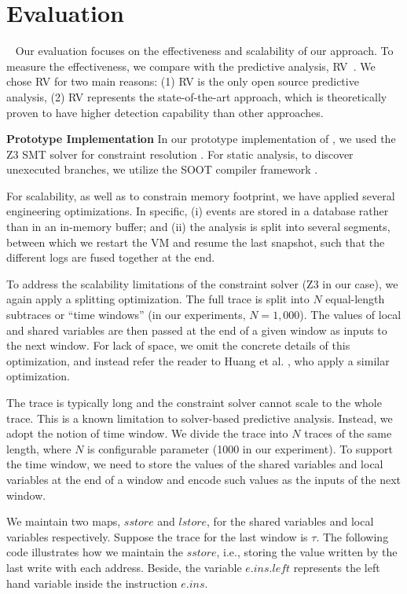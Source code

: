 \section{Evaluation}~\label{sec:eval}
Our evaluation focuses on the effectiveness  and scalability of our approach.
To measure the effectiveness, we compare with the predictive analysis, {\sf RV}~\cite{}. We chose RV for two main reasons: (1) {\sf RV} is the only open source predictive analysis, (2) {\sf RV} represents the state-of-the-art approach, which is theoretically proven to have higher detection capability than other approaches. 

{\bf Prototype Implementation}  In our prototype implementation of \tool, we used the Z3 SMT solver for constraint resolution \cite{DeMoura:2008}. For static analysis, to discover unexecuted branches, we utilize the SOOT compiler framework \cite{Vallee-Rai:1999}.

For scalability, as well as to constrain memory footprint, we have applied several engineering optimizations. In specific, (i) events are stored in a database rather than in an in-memory buffer; and (ii) the analysis is split into several segments, between which we restart the VM and resume the last snapshot, such that the different logs are fused together at the end. 

To address the scalability limitations of the constraint solver (Z3 in our case), we again apply a splitting optimization. The full trace is split into $N$ equal-length subtraces or ``time windows'' (in our experiments, $N=1,000$). The values of local and shared variables are then passed at the end of a given window as inputs to the next window. For lack of space, we omit the concrete details of this optimization, and instead refer the reader to Huang et al. \cite{HuangMR14}, who apply a similar optimization.

The trace is typically long and the constraint solver cannot scale to the whole trace. This is a known limitation to solver-based predictive analysis. Instead, we adopt the notion of time window. 
We divide the trace into $N$ traces of the same length, where $N$ is configurable parameter (1000 in our experiment). To support the time window, we need to store the values of the shared variables and local variables at the end of a window and encode such values as the inputs of the next window. 

We maintain two maps,  $sstore$ and $lstore$, for the shared variables and local variables respectively. Suppose the trace for the last window is $\tau$. The following code illustrates how we maintain the $sstore$, i.e., storing the value written by the last write with each address. Beside, the variable $e.ins.left$ represents the left hand variable inside the instruction $e.ins$.

